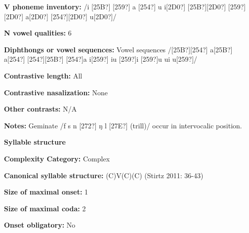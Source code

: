 \begin{styleBody}
\textbf{V phoneme inventory:} /i [25B?] [259?] a [254?] u i[2D0?] [25B?][2D0?] [259?][2D0?] a[2D0?] [254?][2D0?] u[2D0?]/
\end{styleBody}

\begin{styleBody}
\textbf{N vowel qualities:} 6
\end{styleBody}

\begin{styleBody}
\textbf{Diphthongs or vowel sequences:} Vowel sequences /[25B?][254?] a[25B?] a[254?] [254?][25B?] [254?]a i[259?] iu [259?]i [259?]u ui u[259?]/
\end{styleBody}

\begin{styleBody}
\textbf{Contrastive length:} All
\end{styleBody}

\begin{styleBody}
\textbf{Contrastive nasalization:} None
\end{styleBody}

\begin{styleBody}
\textbf{Other contrasts:} N/A
\end{styleBody}

\begin{styleBody}
\textbf{Notes:} Geminate /f s n [272?] ŋ l [27E?] (trill)/ occur in intervocalic position.
\end{styleBody}

\begin{styleBody}
\textbf{Syllable structure}
\end{styleBody}

\begin{styleBody}
\textbf{Complexity Category:} Complex
\end{styleBody}

\begin{styleBody}
\textbf{Canonical syllable structure:} (C)V(C)(C)\textbf{ }(Stirtz 2011: 36-43)
\end{styleBody}

\begin{styleBody}
\textbf{Size of maximal onset:} 1
\end{styleBody}

\begin{styleBody}
\textbf{Size of maximal coda:} 2
\end{styleBody}

\begin{styleBody}
\textbf{Onset obligatory:} No
\end{styleBody}

